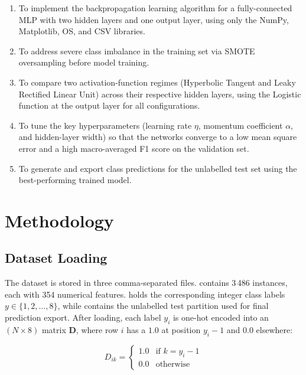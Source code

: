 \documentclass{acm_proc_article-sp}
\begin{document}
\begin{enumerate}
  \item To implement the backpropagation learning algorithm for a
        fully-connected MLP with two hidden layers and one output layer,
        using only the NumPy, Matplotlib, OS, and CSV libraries.
  \item To address severe class imbalance in the training set via SMOTE
        oversampling before model training.
  \item To compare two activation-function regimes (Hyperbolic Tangent
        and Leaky Rectified Linear Unit) across their respective hidden
        layers, using the Logistic function at the output layer for all
        configurations.
  \item To tune the key hyperparameters (learning rate $\eta$, momentum
        coefficient $\alpha$, and hidden-layer width) so that the networks
        converge to a low mean square error and a high macro-averaged F1
        score on the validation set.
  \item To generate and export class predictions for the unlabelled test
        set using the best-performing trained model.
\end{enumerate}

\section{Methodology}

\subsection{Dataset Loading}

The dataset is stored in three comma-separated files.
 contains 3\,486 instances, each with 354 numerical
features.  holds the corresponding integer class
labels $y \in \{1, 2, \ldots, 8\}$, while  contains
the unlabelled test partition used for final prediction export. After
loading, each label $y_i$ is one-hot encoded into an $(N \times 8)$
matrix $\mathbf{D}$, where row $i$ has a $1.0$ at position $y_i - 1$
and $0.0$ elsewhere:

\begin{equation}
  D_{ik} =
  \begin{cases}
    1.0 & \text{if } k = y_i - 1 \\
    0.0 & \text{otherwise}
  \end{cases}
\end{equation}
\end{document}
